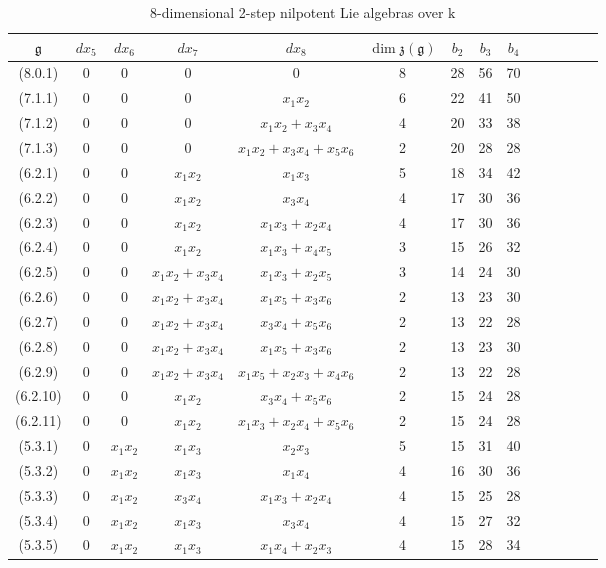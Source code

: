 \documentclass[10pt,reqno]{amsart}
\newcommand{\kk}{\mathrm{k}}
\newcommand{\frg}{\mathfrak{g}}
\theoremstyle{definition}
\begin{document}
\begin{table}[h!]\label{table:final}
\caption{8-dimensional 2-step nilpotent Lie algebras over $\kk$}
{\tabulinesep=1mm
\begin{tabu}{|c|c|c|c|c|c|c|c|c|c|c|c|c|c|}
\hline
$\frg$ & $dx_5$ & $dx_6$ & $dx_7$ & $dx_8$ & $\dim \mathfrak{z}(\frg)$ & $b_2$ & $b_3$ & $b_4$\\
\hline
(8.0.1) & 0 & 0 & 0 & 0 & 8 & 28 & 56 & 70\\
\hline
(7.1.1) & 0 & 0 & 0 & $x_1x_2$ & 6 & 22 & 41 & 50\\
\hline
(7.1.2) & 0 & 0 & 0 & $x_1x_2+x_3x_4$ & 4 & 20 & 33 & 38\\
\hline
(7.1.3) & 0 & 0 & 0 & $x_1x_2+x_3x_4+x_5x_6$ & 2 & 20 & 28 & 28\\
\hline
(6.2.1) & 0 & 0 & $x_1x_2$ & $x_1x_3$ & 5 & 18 & 34 & 42\\
\hline
(6.2.2) & 0 & 0 & $x_1x_2$ & $x_3x_4$ & 4 & 17 & 30 & 36\\
\hline
(6.2.3) & 0 & 0 & $x_1x_2$ & $x_1x_3+x_2x_4$ & 4 & 17 & 30 & 36\\
\hline
(6.2.4) & 0 & 0 & $x_1x_2$ & $x_1x_3+x_4x_5$ & 3 & 15 & 26 & 32\\
\hline
(6.2.5) & 0 & 0 & $x_1x_2+x_3x_4$ & $x_1x_3+x_2x_5$ & 3 & 14 & 24 & 30\\
\hline
(6.2.6) & 0 & 0 & $x_1x_2+x_3x_4$ & $x_1x_5+x_3x_6$ & 2 & 13 & 23 & 30\\
\hline
(6.2.7) & 0 & 0 & $x_1x_2+x_3x_4$ & $x_3x_4+x_5x_6$ & 2 & 13 & 22 & 28\\
\hline
(6.2.8) & 0 & 0 & $x_1x_2+x_3x_4$ & $x_1x_5+x_3x_6$ & 2 & 13 & 23 & 30\\
\hline
(6.2.9) & 0 & 0 & $x_1x_2+x_3x_4$ & $x_1x_5+x_2x_3+x_4x_6$ & 2 & 13 & 22 & 28\\
\hline
(6.2.10) & 0 & 0 & $x_1x_2$ & $x_3x_4+x_5x_6$ & 2 & 15 & 24 & 28\\
\hline
(6.2.11) & 0 & 0 & $x_1x_2$ & $x_1x_3+x_2x_4+x_5x_6$ & 2 & 15 & 24 & 28 \\
\hline
(5.3.1) & 0 & $x_1x_2$ & $x_1x_3$ & $x_2x_3$ & 5 & 15 & 31 & 40\\
\hline
(5.3.2) & 0 & $x_1x_2$ & $x_1x_3$ & $x_1x_4$ & 4 & 16 & 30 & 36 \\
\hline
(5.3.3) & 0 & $x_1x_2$ & $x_3x_4$ & $x_1x_3+x_2x_4$ & 4 & 15 & 25 & 28 \\
\hline
(5.3.4) & 0 & $x_1x_2$ & $x_1x_3$ & $x_3x_4$ & 4 & 15 & 27 & 32 \\
\hline
(5.3.5) & 0 & $x_1x_2$ & $x_1x_3$ & $x_1x_4+x_2x_3$ & 4 & 15 & 28 & 34 \\

\end{tabu}}
\end{table}
\end{document}
